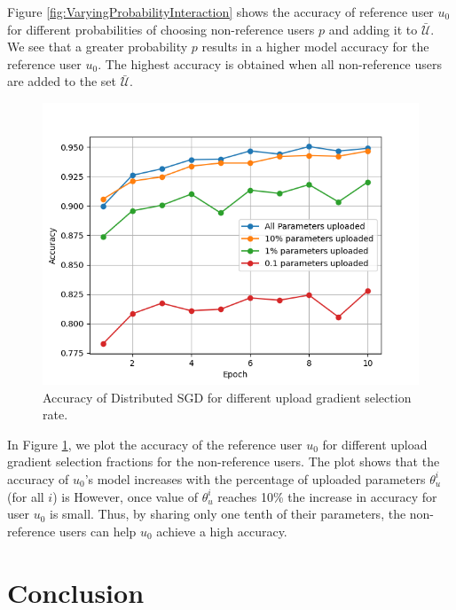 \documentclass[conference]{IEEEtran}
\begin{document}
Figure \ref{fig:VaryingProbabilityInteraction} shows the accuracy of reference user $u_0$ for different probabilities of choosing
non-reference users $p$ and adding it to $\bar{\mathcal{U}}$.
We see that a greater probability $p$ results in a higher model accuracy for the reference user $u_0$.
The highest accuracy is obtained when all non-reference users are added to the set $\bar{\mathcal{U}}$. 

\begin{figure}[!h]
\centering
\includegraphics[width=0.9\columnwidth, keepaspectratio]{VaryingThetaUGrid}
\caption{Accuracy of Distributed SGD for different upload gradient selection rate. }
\label{fig:VaryingThetaU}
\end{figure}

In Figure \ref{fig:VaryingThetaU}, we plot the accuracy of the reference user $u_0$ for different upload gradient selection fractions
for the non-reference users. 
The plot shows that the accuracy of $u_0$'s model increases with the percentage of uploaded parameters $\theta_u^i$ (for all $i$) is
However, once value of $\theta_u^i$ reaches 10\% the increase in accuracy for user $u_0$ is small. Thus, by sharing only one tenth
of their parameters, the non-reference users can help $u_0$ achieve a  high accuracy. 



\section{Conclusion}
\end{document}

